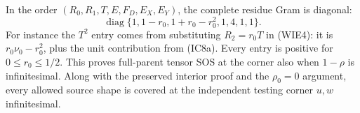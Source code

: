 In the order $(R_0,R_1,T,E,F_D,E_X,E_Y)$, the complete residue Gram
is diagonal:
\[
 \operatorname{diag}\{1,1-r_0,1+r_0-r_0^2,1,4,1,1\}.
\tag{WIE6}
\]
For instance the $T^2$ entry comes from substituting $R_2=r_0T$
in (WIE4): it is $r_0\nu_0-r_0^2$, plus the unit contribution from
(IC8a). Every entry is positive for $0\le r_0\le1/2$.
This proves full-parent tensor SOS at the corner also when
$1-\rho$ is infinitesimal. Along with the preserved interior proof
and the $\rho_0=0$ argument, every allowed source shape is covered
at the independent testing corner $u,w$ infinitesimal.
